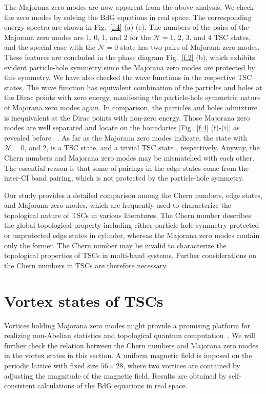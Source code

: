 \documentclass[12pt]{iopart}
\begin{document}
The Majorana zero modes are now apparent from the above analysis. We check the zero modes by solving the BdG equations in real space. The corresponding energy spectra are shown in Fig.~\ref{f.4} (a)-(e). The numbers of the pairs of the Majorana zero modes are $1$, $0$, $1$, and $2$ for the $\mathcal{N}=1$, $2$, $3$, and $4$ TSC states, and the special case with the $\mathcal{N}=0$ state has two pairs of Majorana zero modes. These features are concluded in the phase diagram Fig.~\ref{f.2} (b), which exhibits evident particle-hole symmetry since the Majorana zero modes are protected by this symmetry. We have also checked the wave functions in the respective TSC states. The wave function has equivalent combination of the particles and holes at the Dirac points with zero energy, manifesting the particle-hole symmetric nature of Majorana zero modes again. In comparison, the particles and holes admixture is inequivalent at the Dirac points with non-zero energy. Those Majorana zero modes are well separated and locate on the boundaries [Fig.~\ref{f.4} (f)-(i)] as revealed before ~\cite{Liu-SR2016}. As far as the Majorana zero modes indicate, the state with $\mathcal{N}=0$, and $2$, is a TSC state, and a trivial TSC state \cite{Qi-PRB2010}, respectively. Anyway, the Chern numbers and Majorana zero modes may be mismatched with each other. The essential reason is that some of pairings in the edge states come from the inter-CI band pairing, which is not protected by the particle-hole symmetry.

Our study provides a detailed comparison among the Chern numbers, edge states, and Majorana zero modes, which are frequently used to characterize the topological nature of TSCs in various literatures. The Chern number describes the global topological property including either particle-hole symmetry protected or unprotected edge states in cylinder, whereas the Majorana zero modes contain only the former. The Chern number may be invalid to characterize the topological properties of TSCs in multi-band systems. Further considerations on the Chern numbers in TSCs are therefore necessary.

\section{Vortex states of TSCs}
Vortices holding Majorana zero modes might provide a promising platform for realizing non-Abelian statistics and topological quantum computation~\cite{Nayak-RMP2008,Alicea-RPP2012,Alicea-NP2011}. We will further check the relation between the Chern numbers and Majorana zero modes in the vortex states in this section. A uniform magnetic field is imposed on the periodic lattice with fixed size $56\times28$, where two vortices are contained by adjusting the magnitude of the magnetic field. Results are obtained by self-consistent calculations of the BdG equations in real space.
\end{document}
